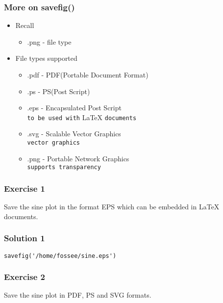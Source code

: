 \documentclass[presentation]{beamer}
\begin{document}
\begin{frame}
\frametitle{More on savefig()}
\label{sec-4}
\begin{itemize}

\item Recall
\label{sec-4_1}%
\begin{itemize}
\item .png - file type
\end{itemize}


\item File types supported
\label{sec-4_2}%
\begin{itemize}

\item .pdf - PDF(Portable Document Format)\\
\label{sec-4_2_1}%
\item .ps - PS(Post Script)\\
\label{sec-4_2_2}%
\item .eps - Encapsulated Post Script\\
\label{sec-4_2_3}%
\texttt{to be used with} \LaTeX{} \texttt{documents}

\item .svg - Scalable Vector Graphics\\
\label{sec-4_2_4}%
\texttt{vector graphics}

\item .png - Portable Network Graphics\\
\label{sec-4_2_5}%
\texttt{supports transparency}
\end{itemize} %
\end{itemize} %
\end{frame}
\begin{frame}
\frametitle{Exercise 1}
\label{sec-5}

  Save the sine plot in the format EPS which can be embedded in \LaTeX{} documents.
\end{frame}
\begin{frame}[fragile]
\frametitle{Solution 1}
\label{sec-6}

\begin{verbatim}
savefig('/home/fossee/sine.eps')
\end{verbatim}
\end{frame}
\begin{frame}
\frametitle{Exercise 2}
\label{sec-7}

  Save the sine plot in PDF, PS and SVG formats.
\end{frame}
\end{document}
